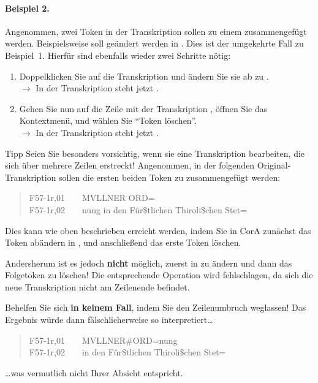 \documentclass[11pt,a4paper,parskip=half]{scrartcl}
\begin{document}
\paragraph{Beispiel 2.}  Angenommen, zwei Token in der Transkription
sollen zu einem zusammengefügt werden.  Beispielsweise soll
 geändert werden in .  Dies ist der
umgekehrte Fall zu Beispiel~1.  Hierfür sind ebenfalls wieder zwei
Schritte nötig:
\begin{enumerate}
\item Doppelklicken Sie auf die Transkription  und ändern
  Sie sie ab zu .\\$\to$ In der Transkription steht
  jetzt .
\item Gehen Sie nun auf die Zeile mit der Transkription ,
  öffnen Sie das Kontextmenü, und wählen Sie "`Token löschen"'.\\$\to$
  In der Transkription steht jetzt .
\end{enumerate}

\begin{infobox}{Tipp}
  Seien Sie besonders vorsichtig, wenn sie eine Transkription
  bearbeiten, die sich über mehrere Zeilen erstreckt!  Angenommen, in
  der folgenden Original-Transkription sollen die ersten beiden Token
  zu  zusammengefügt werden:

  \begin{quote}\ttfamily\small
    F57-1r,01~~~~MVLLNER ORD=\\
    F57-1r,02~~~~nung in den Für\$tlichen Thiroli\$chen Stet=
  \end{quote}

  Dies kann wie oben beschrieben erreicht werden, indem Sie in CorA
  zunächst das Token  abändern in
  , und anschließend das erste Token
   löschen.

  Andersherum ist es jedoch \textbf{nicht} möglich, zuerst  in
   zu ändern und dann das Folgetoken zu löschen!  Die
  entsprechende Operation wird fehlschlagen, da sich die neue Transkription
  nicht am Zeilenende befindet.

  Behelfen Sie sich \textbf{in keinem Fall}, indem Sie den Zeilenumbruch
  weglassen!  Das Ergebnis würde dann fälschlicherweise so interpretiert\ldots{}

  \begin{quote}\ttfamily\small
    F57-1r,01~~~~MVLLNER\#ORD=nung\\
    F57-1r,02~~~~in den Für\$tlichen Thiroli\$chen Stet=
  \end{quote}

  \ldots{}was vermutlich nicht Ihrer Absicht entspricht.
\end{infobox}
\end{document}
